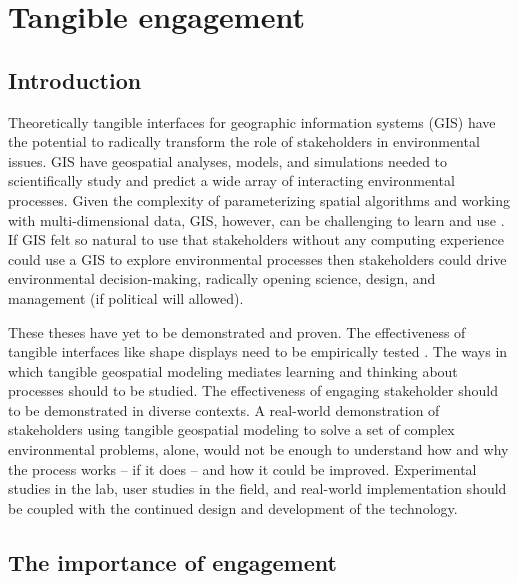 \documentclass{article}
\begin{document}

\section{Tangible engagement}

\subsection{Introduction}

Theoretically tangible interfaces for geographic information systems (GIS) have the potential to
radically transform the role of stakeholders in 
environmental issues. 
%
GIS have geospatial analyses, models, and simulations 
needed to scientifically study and predict a wide array of interacting environmental processes. 
%
Given the complexity of parameterizing spatial algorithms and working with multi-dimensional data, 
GIS, however, can be challenging to learn and use \citep{Ratti2004}.
%
If GIS felt so natural to use that stakeholders without any computing experience could use a GIS to explore environmental processes 
then stakeholders could drive environmental decision-making,
radically opening science, design, and management (if political will allowed). 
%

These theses have yet to be demonstrated and proven. 
The effectiveness of tangible interfaces like shape displays need to be empirically tested \citep{Rasmussen2012}. 
The ways in which tangible geospatial modeling mediates learning and thinking about processes should to be studied. 
The effectiveness of engaging stakeholder should to be demonstrated in diverse contexts. 
A real-world demonstration of stakeholders using tangible geospatial modeling to solve a set of complex environmental problems, 
alone,
would not be enough to understand how and why the process works -- if it does -- and how it could be improved. 
Experimental studies in the lab, user studies in the field, and real-world implementation should be coupled with the continued design and development of the technology.


\subsection{The importance of engagement}
\end{document}
